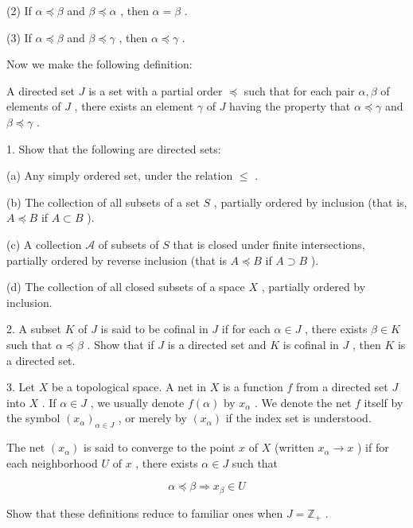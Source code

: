 (2) If \(\alpha  \preccurlyeq  \beta\) and \(\beta  \preccurlyeq  \alpha\) , then \(\alpha  = \beta\) .

(3) If \(\alpha  \preccurlyeq  \beta\) and \(\beta  \preccurlyeq  \gamma\) , then \(\alpha  \preccurlyeq  \gamma\) .

Now we make the following definition:

A directed set \(J\) is a set with a partial order \(\preccurlyeq\) such that for each pair \(\alpha ,\beta\) of elements of \(J\) , there exists an element \(\gamma\) of \(J\) having the property that \(\alpha  \preccurlyeq  \gamma\) and \(\beta  \preccurlyeq  \gamma\) .

1. Show that the following are directed sets:

(a) Any simply ordered set, under the relation \(\leq\) .

(b) The collection of all subsets of a set \(S\) , partially ordered by inclusion (that is, \(A \preccurlyeq  B\) if \(A \subset  B\) ).

(c) A collection \(\mathcal{A}\) of subsets of \(S\) that is closed under finite intersections, partially ordered by reverse inclusion (that is \(A \preccurlyeq  B\) if \(A \supset  B\) ).

(d) The collection of all closed subsets of a space \(X\) , partially ordered by inclusion.

2. A subset \(K\) of \(J\) is said to be cofinal in \(J\) if for each \(\alpha  \in  J\) , there exists \(\beta  \in  K\) such that \(\alpha  \preccurlyeq  \beta\) . Show that if \(J\) is a directed set and \(K\) is cofinal in \(J\) , then \(K\) is a directed set.

3. Let \(X\) be a topological space. A net in \(X\) is a function \(f\) from a directed set \(J\) into \(X\) . If \(\alpha  \in  J\) , we usually denote \(f\left( \alpha \right)\) by \({x}_{\alpha }\) . We denote the net \(f\) itself by the symbol \({\left( {x}_{\alpha }\right) }_{\alpha  \in  J}\) , or merely by \(\left( {x}_{\alpha }\right)\) if the index set is understood.

The net \(\left( {x}_{\alpha }\right)\) is said to converge to the point \(x\) of \(X\) (written \({x}_{\alpha } \rightarrow  x\) ) if for each neighborhood \(U\) of \(x\) , there exists \(\alpha  \in  J\) such that

\[
\alpha  \preccurlyeq  \beta  \Rightarrow  {x}_{\beta } \in  U
\]

Show that these definitions reduce to familiar ones when \(J = {\mathbb{Z}}_{ + }\) .

